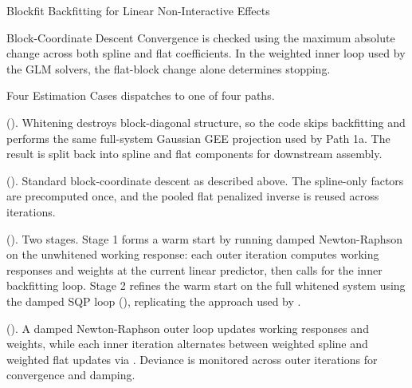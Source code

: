 \begin{Section}{Blockfit Backfitting for Linear Non-Interactive Effects}
\begin{SubSection}{Block-Coordinate Descent}
Convergence is checked using the maximum absolute change across both
spline and flat coefficients. In the weighted inner loop used by the GLM
solvers, the flat-block change alone determines stopping.
\end{SubSection}


%
\begin{SubSection}{Four Estimation Cases}
 dispatches to one of four paths.

().
Whitening destroys block-diagonal structure, so the code skips
backfitting and performs the same full-system Gaussian GEE projection
used by  Path 1a. The result is split back into
spline and flat components for downstream assembly.

().
Standard block-coordinate descent as described above. The spline-only
 factors are precomputed once, and the
pooled flat penalized inverse is reused across iterations.

().
Two stages. Stage 1 forms a warm start by running damped Newton-Raphson
on the unwhitened working response: each outer iteration computes
working responses and weights at the current linear predictor, then
calls  for the inner backfitting loop.
Stage 2 refines the warm start on the full whitened system using the
damped SQP loop (), replicating the approach
used by .

().
A damped Newton-Raphson outer loop updates working responses and weights,
while each inner iteration alternates between weighted spline and
weighted flat updates via . Deviance is
monitored across outer iterations for convergence and damping.
\end{SubSection}



\end{Section}
